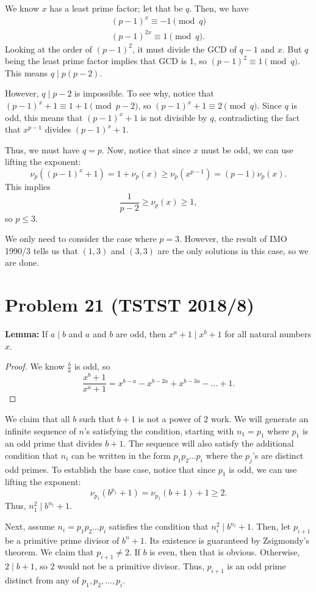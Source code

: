 \documentclass{scrartcl}
\begin{document}
We know $x$ has a least prime factor; let that be $q$. Then, we have
\begin{align*}
    (p-1)^x \equiv -1 \pmod{q} \\
    (p-1)^{2x} \equiv 1 \pmod{q}.
\end{align*}
Looking at the order of $(p-1)^2$, it must divide the GCD of $q-1$ and $x$. But $q$ being the least prime factor implies that GCD is $1$, so $(p-1)^2 \equiv 1 \pmod{q}$. This means $q \mid p(p-2)$.

However, $q \mid p-2$ is impossible. To see why, notice that $(p-1)^x + 1 \equiv 1 + 1 \pmod{p-2}$, so $(p-1)^x + 1 \equiv 2 \pmod{q}$. Since $q$ is odd, this means that $(p-1)^x + 1$ is not divisible by $q$, contradicting the fact that $x^{p-1}$ divides $(p-1)^x + 1$.

Thus, we must have $q = p$. Now, notice that since $x$ must be odd, we can use lifting the exponent:
\[ \nu_p((p-1)^x + 1) = 1 + \nu_p(x) \geq \nu_p(x^{p-1}) = (p-1)\nu_p(x). \]
This implies
\[ \frac{1}{p-2} \geq \nu_p(x) \geq 1, \]
so $p \leq 3$.

We only need to consider the case where $p = 3$. However, the result of IMO 1990/3 tells us that $(1,3)$ and $(3,3)$ are the only solutions in this case, so we are done.

\section*{Problem 21 (TSTST 2018/8)}
\textbf{Lemma:} If $a \mid b$ and $a$ and $b$ are odd, then $x^a + 1 \mid x^b + 1$ for all natural numbers $x$.
\begin{proof}
We know $\frac{b}{a}$ is odd, so
\[ \frac{x^b + 1}{x^a + 1} = x^{b-a} - x^{b-2a} + x^{b-3a} - \ldots + 1. \]
\end{proof}

We claim that all $b$ such that $b+1$ is not a power of $2$ work.
We will generate an infinite sequence of $n$'s satisfying the condition, starting with $n_1 = p_1$ where $p_1$ is an odd prime that divides $b+1$.
The sequence will also satisfy the additional condition that $n_i$ can be written in the form $p_1p_2\ldots p_i$ where the $p_j$'s are distinct odd primes.
To establish the base case, notice that since $p_1$ is odd, we can use lifting the exponent:
\[ \nu_{p_1}(b^{p_1} + 1) = \nu_{p_1}(b + 1) + 1 \geq 2. \]
Thus, $n_1^2 \mid b^{n_1} + 1$.

Next, assume $n_i = p_1p_2\ldots p_i$ satisfies the condition that $n_i^2 \mid b^{n_i} + 1$.
Then, let $p_{i+1}$ be a primitive prime divisor of $b^n + 1$.
Its existence is guaranteed by Zsigmondy's theorem.
We claim that $p_{i+1} \neq 2$.
If $b$ is even, then that is obvious.
Otherwise, $2 \mid b+1$, so $2$ would not be a primitive divisor.
Thus, $p_{i+1}$ is an odd prime distinct from any of $p_1,p_2,\ldots,p_i$.
\end{document}
